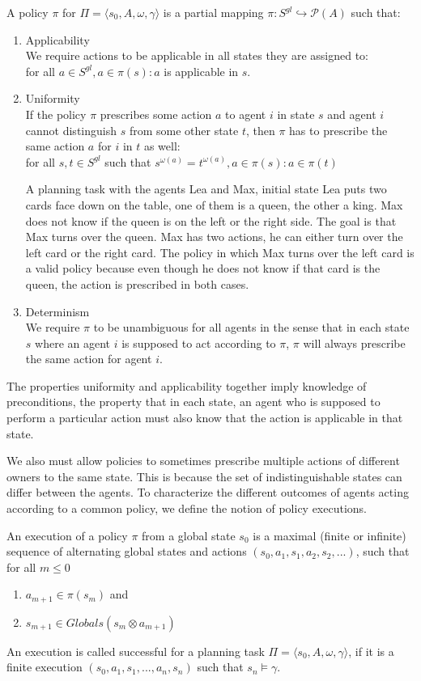 A policy $\pi$ for $\Pi = \langle s_0, A, \omega, \gamma \rangle$ is a partial mapping $\pi: S^{gl} \hookrightarrow \mathcal{P}(A)$ such that:
\begin{enumerate}
  \item Applicability\\
    We require actions to be applicable in all states they are assigned to: \\
    for all $a \in S^{gl}, a \in \pi(s): a$ is applicable in $s$.
  \item Uniformity \\
    If the policy $\pi$ prescribes some action $a$ to agent $i$ in state $s$ and agent $i$ cannot distinguish $s$ from some other state $t$, then $\pi$ has to prescribe the same action $a$ for $i$ in $t$ as well: \\
    for all $s,t \in S^{gl} $ such that $ s^{\omega(a)} = t^{\omega(a)}, a \in \pi(s): a \in \pi(t)$

    A planning task with the agents Lea and Max,
    initial state Lea puts two cards face down on the table, one of them is a queen, the other a king. Max does not know if the queen is on the left or the right side. The goal is that Max turns over the queen. Max has two actions, he can either turn over the left card or the right card. The policy in which Max turns over the left card is a valid policy because even though he does not know if that card is the queen, the action is prescribed in both cases.


  \item Determinism \\
    We require $\pi$ to be unambiguous for all agents in the sense that in each state $s$ where an agent $i$ is supposed to act according to $\pi$, $\pi$ will always prescribe the same action for agent $i$.
\end{enumerate}

The properties uniformity and applicability together imply knowledge of preconditions, the property that in each state, an agent who is supposed to perform a particular action must also know that the action is applicable in that state.

We also must allow policies to sometimes prescribe multiple actions of different owners to the same state. This is because the set of indistinguishable states can differ between the agents. To characterize the different outcomes of agents acting according to a common policy, we define the notion of policy executions.

An execution of a policy $\pi$ from a global state $s_0$ is a maximal (finite or infinite) sequence of alternating global states and actions $(s_0, a_1, s_1, a_2, s_2,...)$, such that for all $ m \leq 0$
\begin{enumerate}
  \item $a_{m+1} \in \pi(s_m)$ and
  \item $s_{m+1} \in Globals(s_m \otimes a_{m+1})$
\end{enumerate}
An execution is called successful for a planning task $\Pi = \langle s_0, A, \omega, \gamma \rangle$, if it is a finite execution $(s_0, a_1, s_1,...,a_n, s_n)$ such that $s_n \models \gamma$.

